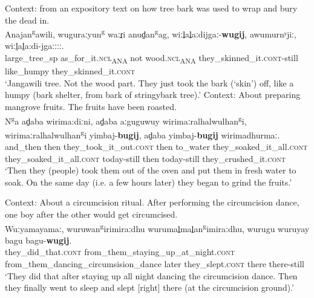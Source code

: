 \begin{exe}
	\ex\label{appendixWubuyRestrictive3}
	Context: from an expository text on how tree bark was used to wrap and bury the dead in.\\
	\gll Anajan\textsuperscript{g}awili, wuguraːyun\textsuperscript{g} waːr̠i anud̠an\textsuperscript{g}ag, wiːl̠al̠aːdijgaː-\textbf{wugij}, awumurnʸjiː, wiːl̠al̠a:di-jgaːːːː.\\
	large\_tree\_sp as\_for\_it.\textsc{ncl}\textsubscript{ANA} not wood.\textsc{ncl}\textsubscript{ANA} they\_skinned\_it.\textsc{cont}-still like\_humpy they\_skinned\_it.\textsc{cont}\\ 
	\glt \lq Jangawili tree. Not the wood part. They just took the bark (\lq skin') off, like a humpy (bark shelter, from bark of stringybark tree).' \parencite[265]{Heath1980}
	\pagebreak
	\ex Context: About preparing mangrove fruits. The fruits have been roasted.\label{appendixWubuySameDay}\\
	\exi{}\gll N\textsuperscript{g}a ad̠aba wirima:diːni, ad̠aba aːguguwuy wirimaːralhalwulhan\textsuperscript{g}i, wirimaːralhalwulhan\textsuperscript{g}i yimbaj-\textbf{bugij}, ad̠aba yimbaj-\textbf{bugij} wirimadhurmaː.\\
and\_then then they\_took\_it\_out.\textsc{cont} then to\_water they\_soaked\_it\_all.\textsc{cont} they\_soaked\_it\_all.\textsc{cont} today-still then today-still they\_crushed\_it.\textsc{cont}\\
	\glt \lq Then they (people) took them out of the oven and put them in fresh water to soak. On the same day (i.e. a few hours later) they began to grind the fruits.' \parencite[423]{Heath1980}

	\ex\label{appendixWubuyRightThere} 
	Context: About a circumcision ritual. After performing the circumcision dance, one boy after the other would get circumcised.\\
	\gll Wuːyamayamaː, wuruwan\textsuperscript{g}irimiraːdhu wurumal̠mal̠an\textsuperscript{g}imiraːdhu, wurugu wuruyay bagu bagu-\textbf{wugij}.\\
	they\_did\_that.\textsc{cont} from\_them\_staying\_up\_at\_night.\textsc{cont} from\_them\_dancing\_circumsision\_dance later they\_slept.\textsc{cont} there there-still\\
	\glt \lq They did that after staying up all night dancing the circumcision dance. Then they finally went to sleep and slept [right] there (at the circumcision ground).' \parencite[273]{Heath1980}
\end{exe}
